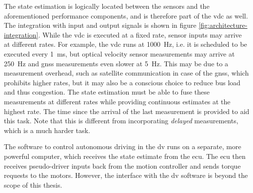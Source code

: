 The state estimation is logically located between the sensors and the aforementioned performance components, and is therefore part of the \gls{vdc} as well. The integration with input and output signals is shown in figure \ref{fig:architecture-integration}. While the \gls{vdc} is executed at a fixed rate, sensor inputs may arrive at different rates. For example, the \gls{vdc} runs at \SI{1000}{\hertz}, i.e. it is scheduled to be executed every \SI{1}{\milli\second}, but optical velocity sensor measurements may arrive at \SI{250}{\hertz} and \gls{gnss} measurements even slower at \SI{5}{\hertz}. This may be due to a measurement overhead, such as satellite communication in case of the \gls{gnss}, which prohibits higher rates, but it may also be a conscious choice to reduce bus load and thus congestion. The state estimation must be able to fuse these measurements at different rates while providing continuous estimates at the highest rate. The time since the arrival of the last measurement is provided to aid this task. Note that this is different from incorporating \textit{delayed} measurements, which is a much harder task.

The software to control autonomous driving in the \gls{dv} runs on a separate, more powerful computer, which receives the state estimate from the \gls{ecu}. The \gls{ecu} then receives pseudo-driver inputs back from the motion controller and sends torque requests to the motors. However, the interface with the \gls{dv} software is beyond the scope of this thesis.
